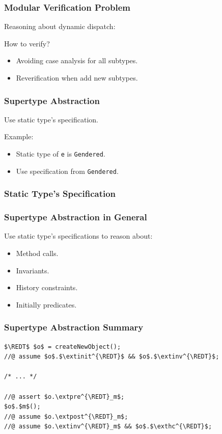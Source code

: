 \begin{frame}[fragile]
\frametitle{Modular Verification Problem}

Reasoning about dynamic dispatch:



How to verify?
\begin{itemize}
\item
Avoiding case analysis for all subtypes.

\item
Reverification when add new subtypes.
\end{itemize}
\end{frame}

\begin{frame}[fragile]
\frametitle{Supertype Abstraction}

Use static type's specification.

Example:



\begin{itemize}
\item
Static type of \lstinline!e! is \lstinline!Gendered!.

\item
Use specification from \lstinline!Gendered!.
\end{itemize}
\end{frame}

\begin{frame}[fragile]
\frametitle{Static Type's Specification}


\end{frame}

\begin{frame}
\frametitle{Supertype Abstraction in General}
Use static type's specifications to reason about:
\begin{itemize}
\item
Method calls.
\item
Invariants.
\item
History constraints.
\item
Initially predicates.
\end{itemize}
\end{frame}

\begin{frame}[fragile]
\frametitle{Supertype Abstraction Summary}

\begin{lstlisting}[mathescape=true]
$\REDT$ $o$ = createNewObject();
//@ assume $o$.$\extinit^{\REDT}$ && $o$.$\extinv^{\REDT}$;

/* ... */

//@ assert $o.\extpre^{\REDT}_m$;
$o$.$m$();
//@ assume $o.\extpost^{\REDT}_m$;
//@ assume $o.\extinv^{\REDT}_m$ && $o$.$\exthc^{\REDT}$;
\end{lstlisting}
\end{frame}

